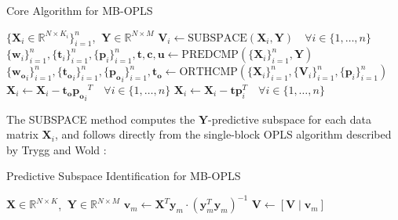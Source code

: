 \begin{algorithm}[H]
\caption{Core Algorithm for MB-OPLS}
\label{algorithm.9.1}
\begin{algorithmic}[1]
\REQUIRE $\{\mathbf{X}_i \in \mathbb{R}^{N \times K_i}\}_{i=1}^n$,%
         $\:\mathbf{Y} \in \mathbb{R}^{N \times M}$
\STATE $\mathbf{V}_i \gets \text{SUBSPACE}(\mathbf{X}_i, \mathbf{Y})
        \quad \forall i \in \{1, \dots, n\}$
\STATE $\{\mathbf{w}_i\}_{i=1}^n,
        \{\mathbf{t}_i\}_{i=1}^n,
        \{\mathbf{p}_i\}_{i=1}^n,
        \mathbf{t}, \mathbf{c}, \mathbf{u} \gets
        \text{PREDCMP}(\{\mathbf{X}_i\}_{i=1}^n, \mathbf{Y})$
\STATE $\{\mathbf{w_o}_i\}_{i=1}^n,
        \{\mathbf{t_o}_i\}_{i=1}^n,
        \{\mathbf{p_o}_i\}_{i=1}^n,
        \mathbf{t_o} \gets
        \text{ORTHCMP}(\{\mathbf{X}_i\}_{i=1}^n,
                       \{\mathbf{V}_i\}_{i=1}^n,
                       \{\mathbf{p}_i\}_{i=1}^n)$
\STATE $\mathbf{X}_i \gets \mathbf{X}_i - \mathbf{t_o} {\mathbf{p_o}_i}^T
        \quad \forall i \in \{1, \dots, n\}$
\STATE $\mathbf{X}_i \gets \mathbf{X}_i - \mathbf{t} \mathbf{p}_i^T
        \quad \forall i \in \{1, \dots, n\}$
\end{algorithmic}
\end{algorithm}

\begin{doublespace}
The SUBSPACE method computes the $\mathbf{Y}$-predictive subspace
for each data matrix $\mathbf{X}_i$, and follows directly from
the single-block OPLS algorithm described by Trygg and Wold
\cite{trygg:jchemo2002}:
\end{doublespace}

\begin{algorithm}[H]
\caption{Predictive Subspace Identification for MB-OPLS}
\label{algorithm.9.2}
\begin{algorithmic}[1]
\REQUIRE $\mathbf{X} \in \mathbb{R}^{N \times K}$,%
       $\:\mathbf{Y} \in \mathbb{R}^{N \times M}$
  \STATE $\mathbf{v}_m \gets \mathbf{X}^T \mathbf{y}_m
          \cdot \left( \mathbf{y}_m^T \mathbf{y}_m \right)^{-1}$
  \STATE $\mathbf{V} \gets [\mathbf{V} \mid \mathbf{v}_m]$
\ENDFOR
\end{algorithmic}
\end{algorithm}

